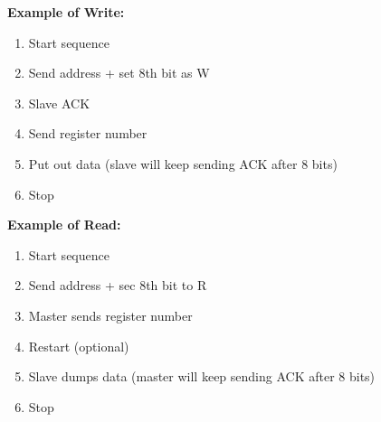 \documentclass{hw}
\begin{document}
\textbf{Example of Write:}
\begin{enumerate}
  \item Start sequence
  \item Send address + set 8th bit as W
  \item Slave ACK
  \item Send register number
  \item Put out data (slave will keep sending ACK after 8 bits)
  \item Stop
\end{enumerate}

\textbf{Example of Read:}
\begin{enumerate}
  \item Start sequence
  \item Send address + sec 8th bit to R
  \item Master sends register number
  \item Restart (optional)
  \item Slave dumps data (master will keep sending ACK after 8 bits)
  \item Stop
\end{enumerate}
\end{document}
